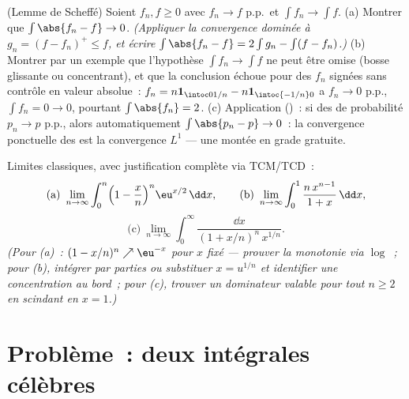 \begin{exercise}[$\star\star$]\label{exo:b3:lebesgue:11}
(Lemme de Scheffé) Soient $f_n, f \geq 0$  avec
$f_n \to f$ p.p.\ et $\int f_n \to \int f$.
(a) Montrer que $\int\abs{f_n - f} \to 0$. \emph{(Appliquer
la convergence dominée à $g_n = (f - f_n)^+ \leq f$, et
écrire $\int\abs{f_n - f} = 2\int g_n - \int(f - f_n)$.)}
(b) Montrer par un exemple que l'hypothèse $\int f_n \to
\int f$ ne peut être omise (bosse glissante ou
concentrant), et que la conclusion échoue pour des $f_n$
signées sans contrôle en valeur absolue~: $f_n = n\mathbf
1_{\intoc0{1/n}} - n\mathbf 1_{\intoc{-1/n}0}$ a $f_n \to
0$ p.p., $\int f_n = 0 \to 0$, pourtant $\int\abs{f_n} =
2$.
(c) Application ()~: si des  de probabilité
$p_n \to p$ p.p., alors automatiquement $\int\abs{p_n - p}
\to 0$~: la convergence ponctuelle des  est la
convergence $L^1$ --- une montée en grade gratuite.
\end{exercise}

\begin{exercise}[$\star\star$]\label{exo:b3:lebesgue:12}
Limites classiques, avec justification complète via
TCM/TCD~:
\[
\text{(a)}\ \lim_{n\to\infty}\int_0^n\Bigl(1 -
\frac xn\Bigr)^n\eu^{x/2}\,\dd x, \qquad
\text{(b)}\ \lim_{n\to\infty}\int_0^1\frac{n\,x^{n-1}}{1 +
x}\,\dd x,
\]
\[
\text{(c)}\ \lim_{n\to\infty}\int_0^\infty
\frac{\dd x}{(1 + x/n)^n\,x^{1/n}} .
\]
\emph{(Pour (a)~: $(1 - x/n)^n \nearrow \eu^{-x}$ pour $x$
fixé --- prouver la monotonie via $\log$~; pour (b),
intégrer par parties ou substituer $x = u^{1/n}$ et
identifier une concentration au bord~; pour (c), trouver un
dominateur  valable pour tout $n \geq 2$ en
scindant en $x = 1$.)}
\end{exercise}

\section{Problème~: deux intégrales célèbres}

